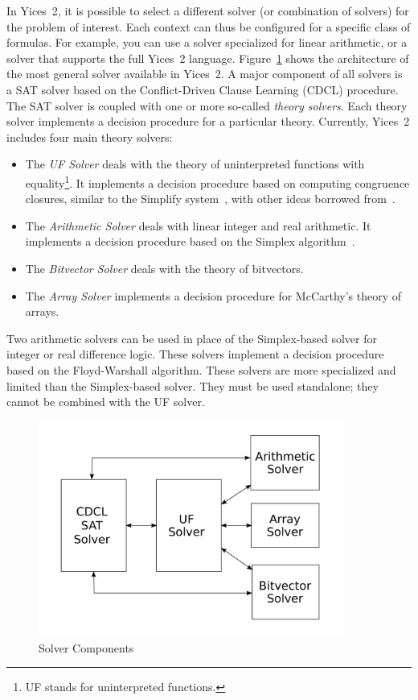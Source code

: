 \documentclass[11pt,twoside,fleqn,openright,titlepage]{cslreport}
\begin{document}
In Yices~2, it is possible to select a different solver (or
combination of solvers) for the problem of interest. Each context can
thus be configured for a specific class of formulas. For example, you
can use a solver specialized for linear arithmetic, or a solver that
supports the full Yices~2 language. Figure~\ref{solver-architecture}
shows the architecture of the most general solver available in
Yices~2. A major component of all solvers is a SAT solver based on the
Conflict-Driven Clause Learning (CDCL) procedure. The SAT solver is
coupled with one or more so-called \emph{theory solvers}. Each theory
solver implements a decision procedure for a particular theory.
Currently, Yices~2 includes four main theory solvers:
\begin{itemize}
\item The \emph{UF Solver} deals with the theory of uninterpreted
  functions with equality\footnote{UF stands for uninterpreted
    functions.}. It implements a decision procedure based on computing
  congruence closures, similar to the Simplify
  system~\cite{Detlefs-etal:JACM2005}, with other ideas borrowed
  from~\cite{Nieuwenhuis+Oliveras:UF:2007}.
\item The \emph{Arithmetic Solver} deals with linear integer and real
  arithmetic.  It implements a decision procedure based on the Simplex
  algorithm~\cite{DutertredeMoura:cav06,DutertredeMoura:report06}.
\item The \emph{Bitvector Solver} deals with the theory of bitvectors.
\item  The \emph{Array  Solver}  implements a  decision procedure  for
  McCarthy's theory of arrays.
\end{itemize}
Two arithmetic solvers can be used in place of the Simplex-based
solver for integer or real difference logic. These solvers implement a
decision procedure based on the Floyd-Warshall algorithm. These
solvers are more specialized and limited than the Simplex-based
solver. They must be used standalone; they cannot be combined with the
UF solver.

\begin{figure}
\begin{center}
\includegraphics[width=10cm]{yices2-arch}
\end{center}
\caption{Solver Components}
\label{solver-architecture}
\end{figure}
\end{document}
